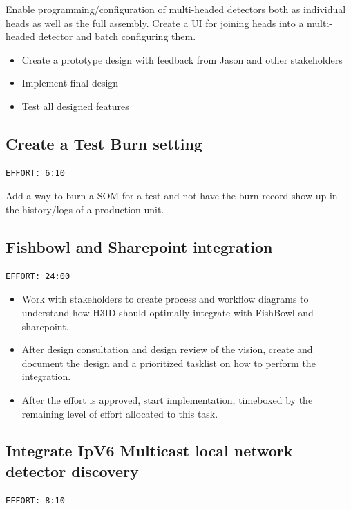 \documentclass[11pt]{article}
\begin{document}
Enable programming/configuration of multi-headed detectors both as individual heads as well as the
full assembly. Create a UI for joining heads into a multi-headed detector and batch configuring them.

\begin{itemize}
\item[{$\square$}] Create a prototype design with feedback from Jason and other stakeholders
\item[{$\square$}] Implement final design
\item[{$\square$}] Test all designed features
\end{itemize}
\subsection{Create a Test Burn setting}
\label{sec:orgd5e8ea2}
\begin{verbatim}
EFFORT: 6:10
\end{verbatim}

Add a way to burn a SOM for a test and not have the burn record show up in the history/logs of a
production unit.
\subsection{Fishbowl and Sharepoint integration}
\label{sec:org2cd86ac}
\begin{verbatim}
EFFORT: 24:00
\end{verbatim}

\begin{itemize}
\item Work with stakeholders to create process and workflow diagrams to understand how H3ID should
optimally integrate with FishBowl and sharepoint.
\item After design consultation and design review of the vision, create and document the design
and a prioritized tasklist on how to perform the integration.
\item After the effort is approved, start implementation, timeboxed by the remaining level of effort
allocated to this task.
\end{itemize}
\subsection{Integrate IpV6 Multicast local network detector discovery}
\label{sec:org9fc9020}
\begin{verbatim}
EFFORT: 8:10
\end{verbatim}
\end{document}
